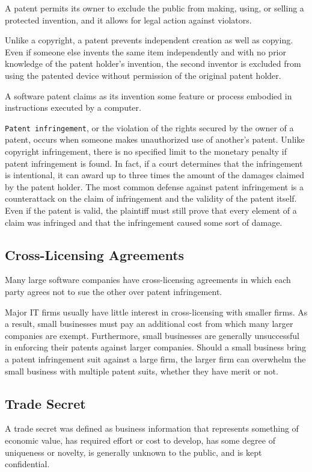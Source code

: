 \documentclass[11pt]{article}
\begin{document}
A patent permits its owner to exclude the public from making, using, or selling a protected invention, and it allows for legal action against violators. 

Unlike a copyright, a patent prevents independent creation as well as copying. Even if someone else invents the same item independently and with no prior knowledge of the patent holder’s invention, the second inventor is excluded from using the patented device without permission of the original patent holder.

A software patent claims as its invention some feature or process embodied in instructions executed by a computer.

\texttt{Patent infringement}, or the violation of the rights secured by the owner of a patent, occurs when someone makes unauthorized use of another’s patent. Unlike copyright infringement, there is no specified limit to the monetary penalty if patent infringement is found. In fact, if a court determines that the infringement is intentional, it can award up to three times the amount of the damages claimed by the patent holder. The most common defense against patent infringement is a counterattack on the claim of infringement and the validity of the patent itself. Even if the patent is valid, the plaintiff must still prove that every element of a claim was infringed and that the infringement caused some sort of damage.
\subsection{Cross-Licensing Agreements}
\label{sec:orge59c265}
Many large software companies have cross-licensing agreements in which each party agrees not to sue the other over patent infringement.

Major IT firms usually have little interest in cross-licensing with smaller firms. As a result, small businesses must pay an additional cost from which many larger companies are exempt. Furthermore, small businesses are generally unsuccessful in enforcing their patents against larger companies. Should a small business bring a patent infringement suit against a large firm, the larger firm can overwhelm the small business with multiple patent suits, whether they have merit or not.
\subsection{Trade Secret}
\label{sec:orgd136d03}
A trade secret was defined as business information that represents something of economic value, has required effort or cost to develop, has some degree of uniqueness or novelty, is generally unknown to the public, and is kept confidential.
\end{document}
